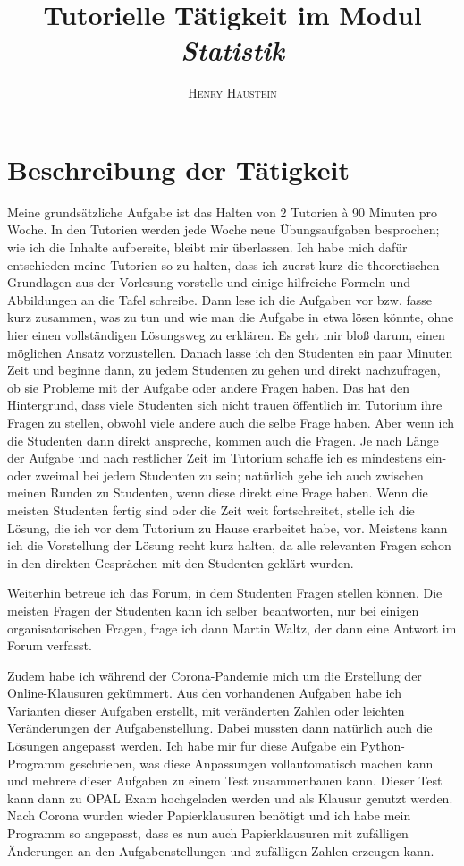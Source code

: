 \documentclass{article}
\title{\textbf{Tutorielle Tätigkeit im Modul \textit{Statistik}}}
\author{\textsc{Henry Haustein}}
\date{}
\begin{document}
	\maketitle
	
	\section*{Beschreibung der Tätigkeit}
	Meine grundsätzliche Aufgabe ist das Halten von 2 Tutorien à 90 Minuten pro Woche. In den Tutorien werden jede Woche neue Übungsaufgaben besprochen; wie ich die Inhalte aufbereite, bleibt mir überlassen. Ich habe mich dafür entschieden meine Tutorien so zu halten, dass ich zuerst kurz die theoretischen Grundlagen aus der Vorlesung vorstelle und einige hilfreiche Formeln und Abbildungen an die Tafel schreibe. Dann lese ich die Aufgaben vor bzw. fasse kurz zusammen, was zu tun und wie man die Aufgabe in etwa lösen könnte, ohne hier einen vollständigen Lösungsweg zu erklären. Es geht mir bloß darum, einen möglichen Ansatz vorzustellen. Danach lasse ich den Studenten ein paar Minuten Zeit und beginne dann, zu jedem Studenten zu gehen und direkt nachzufragen, ob sie Probleme mit der Aufgabe oder andere Fragen haben. Das hat den Hintergrund, dass viele Studenten sich nicht trauen öffentlich im Tutorium ihre Fragen zu stellen, obwohl viele andere auch die selbe Frage haben. Aber wenn ich die Studenten dann direkt anspreche, kommen auch die Fragen. Je nach Länge der Aufgabe und nach restlicher Zeit im Tutorium schaffe ich es mindestens ein- oder zweimal bei jedem Studenten zu sein; natürlich gehe ich auch zwischen meinen Runden zu Studenten, wenn diese direkt eine Frage haben. Wenn die meisten Studenten fertig sind oder die Zeit weit fortschreitet, stelle ich die Lösung, die ich vor dem Tutorium zu Hause erarbeitet habe, vor. Meistens kann ich die Vorstellung der Lösung recht kurz halten, da alle relevanten Fragen schon in den direkten Gesprächen mit den Studenten geklärt wurden.
	
	Weiterhin betreue ich das Forum, in dem Studenten Fragen stellen können. Die meisten Fragen der Studenten kann ich selber beantworten, nur bei einigen organisatorischen Fragen, frage ich dann Martin Waltz, der dann eine Antwort im Forum verfasst.
	
	Zudem habe ich während der Corona-Pandemie mich um die Erstellung der Online-Klausuren gekümmert. Aus den vorhandenen Aufgaben habe ich Varianten dieser Aufgaben erstellt, mit veränderten Zahlen oder leichten Veränderungen der Aufgabenstellung. Dabei mussten dann natürlich auch die Lösungen angepasst werden. Ich habe mir für diese Aufgabe ein Python-Programm geschrieben, was diese Anpassungen vollautomatisch machen kann und mehrere dieser Aufgaben zu einem Test zusammenbauen kann. Dieser Test kann dann zu OPAL Exam hochgeladen werden und als Klausur genutzt werden. Nach Corona wurden wieder Papierklausuren benötigt und ich habe mein Programm so angepasst, dass es nun auch Papierklausuren mit zufälligen Änderungen an den Aufgabenstellungen und zufälligen Zahlen erzeugen kann.
	
\end{document}
